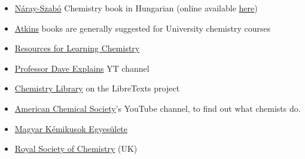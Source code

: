 \documentclass{article}
\begin{document}
\begin{itemize}
    \item \href{https://bookline.hu/product/home.action?_v=Naray_Szabo_Gabor_Kemia&type=22&id=48903}{Náray-Szabó} Chemistry book in Hungarian (online available \href{https://www.scribd.com/doc/249972941/Kemia-Naray-Szabo-Gabor}{here})
    
    \item \href{https://www.goodreads.com/author/show/7164718.Peter_Atkins}{Atkins} books are generally suggested for University chemistry courses
    
    \item \href{https://chemistry.stackexchange.com/questions/37303/resources-for-learning-chemistry}{Resources for Learning Chemistry}
    
    \item \href{https://www.youtube.com/channel/UC0cd_-e49hZpWLH3UIwoWRA}{Professor Dave Explains} YT channel

    \item \href{https://chem.libretexts.org/}{Chemistry Library} on the LibreTexts project
    
    \item \href{https://www.youtube.com/user/AmerChemSoc/playlists?view=50&sort=dd&shelf_id=16}{American Chemical Society}'s YouTube channel, to find out what chemists do.
    
    \item \href{https://www.mke.org.hu/index.php}{Magyar Kémikusok Egyesülete}
    
    \item \href{https://www.rsc.org/}{Royal Society of Chemistry} (UK)
    

\end{itemize}
\end{document}
